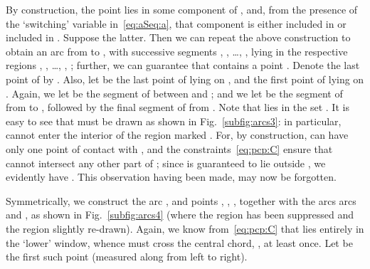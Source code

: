 \documentclass{article}
\begin{document}
By construction, the point  lies in some component of
, and, from the presence of the `switching'
variable  in~\eqref{eq:aSeq:a}, that component is either included
in  or included in . Suppose the latter.  Then we can repeat
the above construction to obtain an arc  from
 to , with successive segments
, , \ldots, ,
 lying in the respective regions , , \dots, , ; further, we can
guarantee that  contains a point .  Denote the last point of  by
. Also, let  be the last point of 
lying on , and  the first point of
 lying on .  Again, we let  be the
segment of  between  and ; and we
let  be the segment of  from  to
, followed by the final segment of  from .
Note that  lies in the set . It is easy to see that 
must be drawn as shown in Fig.~\ref{subfig:arcs3}: in particular,
 cannot enter the interior of the region marked . For,
by construction,  can have only one point of contact with
, and the constraints~\eqref{eq:pcp:C} ensure that 
cannot intersect any other part of ; since  is
guaranteed to lie outside , we evidently have . This observation having been made,  may now be
forgotten.

Symmetrically, we construct the arc , and points ,
, , together with the arcs arcs  and
, as shown in Fig.~\ref{subfig:arcs4} (where the region
 has been suppressed and the region  slightly
re-drawn). Again, we know from~\eqref{eq:pcp:C} that 
lies entirely in the `lower' window, whence  must cross the
central chord, , at least once. Let  be the first such
point (measured along  from left to right).
\end{document}
